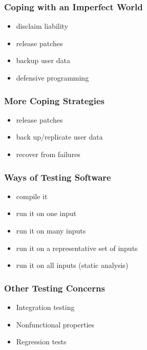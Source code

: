 \documentclass{beamer}
\newenvironment{changemargin}[1]{%
  \begin{list}{}{%
    \setlength{\topsep}{0pt}%
    \setlength{\leftmargin}{#1}%
    \setlength{\rightmargin}{1em}
    \setlength{\listparindent}{\parindent}%
    \setlength{\itemindent}{\parindent}%
    \setlength{\parsep}{\parskip}%
  }%
  \item[]}{\end{list}}
\begin{document}
\begin{frame}
  \frametitle{Coping with an Imperfect World}

  \begin{changemargin}{2em}
  
  \begin{itemize}
   \item disclaim liability
   \item release patches
   \item backup user data
   \item defensive programming
  \end{itemize}
  \end{changemargin}
\end{frame}

\begin{frame}
  \frametitle{More Coping Strategies}

  \Large
  \begin{changemargin}{2em}
    \begin{itemize}
    \item release patches
    \item back up/replicate user data
      \item recover from failures
    \end{itemize}
  \end{changemargin}
\end{frame}

\begin{frame}
  \frametitle{Ways of Testing Software}

  \Large
    \begin{changemargin}{2em}

  \begin{itemize}
   \item compile it
   \item<2-> run it on one input 
   \item<3-> run it on many inputs
   \item<4-> run it on a representative set of inputs
   \item<5-> run it on all inputs (static analysis)
  \end{itemize}
    \end{changemargin}

\end{frame}

\begin{frame}
  \frametitle{Other Testing Concerns}

  \begin{changemargin}{2em}
\Large
  \begin{itemize}
  \item Integration testing
  \item Nonfunctional properties
  \item Regression tests
  \end{itemize}
  \end{changemargin}
\end{frame}
\end{document}
